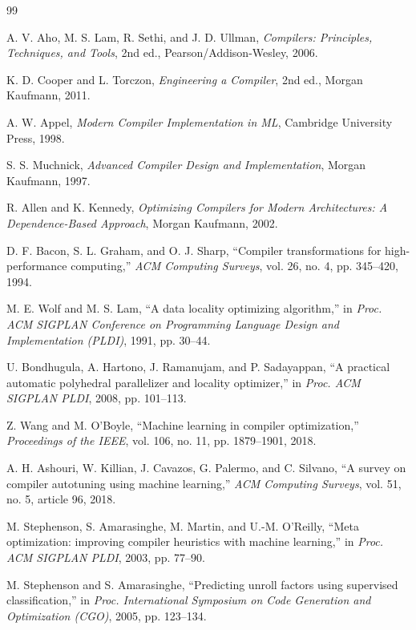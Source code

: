 \begin{thebibliography}{99}

A. V. Aho, M. S. Lam, R. Sethi, and J. D. Ullman,
\textit{Compilers: Principles, Techniques, and Tools},
2nd ed., Pearson/Addison-Wesley, 2006.

K. D. Cooper and L. Torczon,
\textit{Engineering a Compiler},
2nd ed., Morgan Kaufmann, 2011.

A. W. Appel,
\textit{Modern Compiler Implementation in ML},
Cambridge University Press, 1998.

S. S. Muchnick,
\textit{Advanced Compiler Design and Implementation},
Morgan Kaufmann, 1997.

R. Allen and K. Kennedy,
\textit{Optimizing Compilers for Modern Architectures: A Dependence-Based Approach},
Morgan Kaufmann, 2002.

D. F. Bacon, S. L. Graham, and O. J. Sharp,
``Compiler transformations for high-performance computing,''
\textit{ACM Computing Surveys}, vol. 26, no. 4, pp. 345--420, 1994.

M. E. Wolf and M. S. Lam,
``A data locality optimizing algorithm,''
in \textit{Proc. ACM SIGPLAN Conference on Programming Language Design and
Implementation (PLDI)}, 1991, pp. 30--44.

U. Bondhugula, A. Hartono, J. Ramanujam, and P. Sadayappan,
``A practical automatic polyhedral parallelizer and locality optimizer,''
in \textit{Proc. ACM SIGPLAN PLDI}, 2008, pp. 101--113.

Z. Wang and M. O'Boyle,
``Machine learning in compiler optimization,''
\textit{Proceedings of the IEEE}, vol. 106, no. 11, pp. 1879--1901, 2018.

A. H. Ashouri, W. Killian, J. Cavazos, G. Palermo, and C. Silvano,
``A survey on compiler autotuning using machine learning,''
\textit{ACM Computing Surveys}, vol. 51, no. 5, article 96, 2018.

M. Stephenson, S. Amarasinghe, M. Martin, and U.-M. O'Reilly,
``Meta optimization: improving compiler heuristics with machine learning,''
in \textit{Proc. ACM SIGPLAN PLDI}, 2003, pp. 77--90.

M. Stephenson and S. Amarasinghe,
``Predicting unroll factors using supervised classification,''
in \textit{Proc. International Symposium on Code Generation and Optimization (CGO)},
2005, pp. 123--134.


\end{thebibliography}
